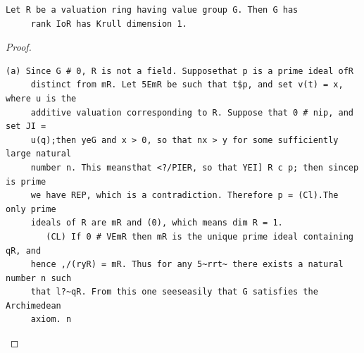 \begin{theorem}\label{mcrt-auto-theorem-10-7}\uses{}
\begin{verbatim}
Let R be a valuation ring having value group G. Then G has
     rank IoR has Krull dimension 1.
\end{verbatim}
\end{theorem}
\begin{proof}
\begin{verbatim}
(a) Since G # 0, R is not a field. Supposethat p is a prime ideal ofR
     distinct from mR. Let 5EmR be such that t$p, and set v(t) = x, where u is the
     additive valuation corresponding to R. Suppose that 0 # nip, and set JI =
     u(q);then yeG and x > 0, so that nx > y for some sufficiently large natural
     number n. This meansthat <?/PIER, so that YEI] R c p; then sincep is prime
     we have REP, which is a contradiction. Therefore p = (Cl).The only prime
     ideals of R are mR and (0), which means dim R = 1.
        (CL) If 0 # VEmR then mR is the unique prime ideal containing qR, and
     hence ,/(ryR) = mR. Thus for any 5~rrt~ there exists a natural number n such
     that l?~qR. From this one seeseasily that G satisfies the Archimedean
     axiom. n
\end{verbatim}
\end{proof}


